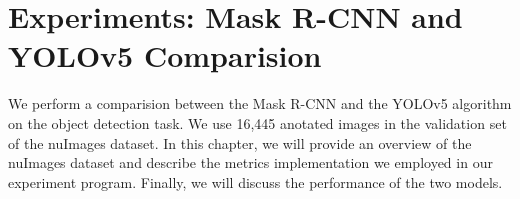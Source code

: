 \chapter{Experiments: Mask R-CNN and YOLOv5 Comparision} \label{chap:experiments}

We perform a comparision between the Mask R-CNN and the YOLOv5 algorithm on the object detection task. We use 16,445 anotated images in the validation set of the nuImages dataset. In this chapter, we will provide an overview of the nuImages dataset and describe the metrics implementation we employed in our experiment program. Finally, we will discuss the performance of the two models.








